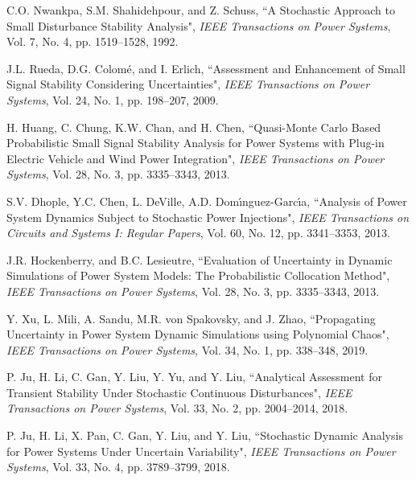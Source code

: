 \documentclass[10pt,twocolumn]{IEEEtran}
\begin{document}
\begin{thebibliography}{99}

C.O. Nwankpa, S.M. Shahidehpour, and Z. Schuss, ``A Stochastic Approach to Small Disturbance Stability Analysis", \emph{IEEE Transactions on Power Systems}, Vol. 7, No. 4, pp. 1519--1528, 1992. 

 
J.L. Rueda, D.G. Colom{\'e}, and I. Erlich, ``Assessment and Enhancement of Small Signal Stability Considering Uncertainties", \emph{IEEE Transactions on Power Systems}, Vol. 24, No. 1, pp. 198--207, 2009. 
 
H. Huang, C. Chung, K.W. Chan, and H. Chen, ``Quasi-Monte Carlo Based Probabilistic Small Signal Stability Analysis for Power Systems with Plug-in Electric Vehicle and Wind Power Integration", \emph{IEEE Transactions on Power Systems}, Vol. 28, No. 3, pp. 3335--3343, 2013.

S.V. Dhople, Y.C. Chen, L. DeVille, A.D. Dom{\'\i}nguez-Garc{\'\i}a, ``Analysis of Power System Dynamics Subject to Stochastic Power Injections", \emph{IEEE Transactions on Circuits and Systems I: Regular Papers}, Vol. 60, No. 12, pp. 3341--3353, 2013.


J.R. Hockenberry, and B.C. Lesieutre, ``Evaluation of Uncertainty in Dynamic Simulations of Power System Models: The Probabilistic Collocation Method", \emph{IEEE Transactions on Power Systems}, Vol. 28, No. 3, pp. 3335--3343, 2013.

Y. Xu, L. Mili, A. Sandu, M.R. von Spakovsky, and J. Zhao, ``Propagating Uncertainty in Power System Dynamic Simulations using Polynomial Chaos", \emph{IEEE Transactions on Power Systems}, Vol. 34, No. 1, pp. 338--348, 2019.


P. Ju, H. Li, C. Gan, Y. Liu, Y. Yu, and Y. Liu, ``Analytical Assessment for Transient Stability Under Stochastic Continuous Disturbances", \emph{IEEE Transactions on Power Systems}, Vol. 33, No. 2, pp. 2004--2014, 2018.

P. Ju, H. Li, X. Pan, C. Gan, Y. Liu, and Y. Liu, ``Stochastic Dynamic Analysis for Power Systems Under Uncertain Variability", \emph{IEEE Transactions on Power Systems}, Vol. 33, No. 4, pp. 3789--3799, 2018.


\end{thebibliography}
\end{document}
